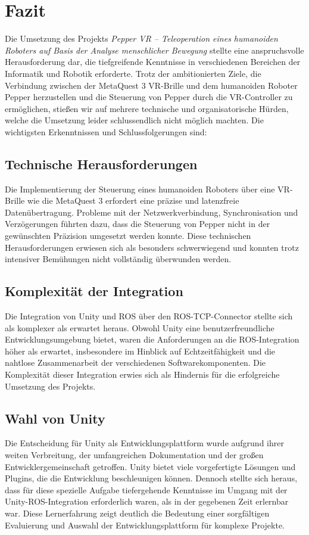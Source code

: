 \chapter{Fazit}

Die Umsetzung des Projekts \textit{Pepper VR – Teleoperation eines humanoiden Roboters auf Basis der Analyse menschlicher Bewegung} stellte eine anspruchsvolle Herausforderung dar, die tiefgreifende Kenntnisse in verschiedenen Bereichen der Informatik und Robotik erforderte. Trotz der ambitionierten Ziele, die Verbindung zwischen der MetaQuest 3 VR-Brille und dem humanoiden Roboter Pepper herzustellen und die Steuerung von Pepper durch die VR-Controller zu ermöglichen, stießen wir auf mehrere technische und organisatorische Hürden, welche die Umsetzung leider schlussendlich nicht möglich machten.
\newline
Die wichtigsten Erkenntnissen und Schlussfolgerungen sind:

\section{Technische Herausforderungen}
Die Implementierung der Steuerung eines humanoiden Roboters über eine VR-Brille wie die MetaQuest 3 erfordert eine präzise und latenzfreie Datenübertragung. Probleme mit der Netzwerkverbindung, Synchronisation und Verzögerungen führten dazu, dass die Steuerung von Pepper nicht in der gewünschten Präzision umgesetzt werden konnte. Diese technischen Herausforderungen erwiesen sich als besonders schwerwiegend und konnten trotz intensiver Bemühungen nicht vollständig überwunden werden.

\section{Komplexität der Integration}
Die Integration von Unity und ROS über den ROS-TCP-Connector stellte sich als komplexer als erwartet heraus. Obwohl Unity eine benutzerfreundliche Entwicklungsumgebung bietet, waren die Anforderungen an die ROS-Integration höher als erwartet, insbesondere im Hinblick auf Echtzeitfähigkeit und die nahtlose Zusammenarbeit der verschiedenen Softwarekomponenten. Die Komplexität dieser Integration erwies sich als Hindernis für die erfolgreiche Umsetzung des Projekts.

\section{Wahl von Unity}
Die Entscheidung für Unity als Entwicklungsplattform wurde aufgrund ihrer weiten Verbreitung, der umfangreichen Dokumentation und der großen Entwicklergemeinschaft getroffen. Unity bietet viele vorgefertigte Lösungen und Plugins, die die Entwicklung beschleunigen können. Dennoch stellte sich heraus, dass für diese spezielle Aufgabe tiefergehende Kenntnisse im Umgang mit der Unity-ROS-Integration erforderlich waren, als in der gegebenen Zeit erlernbar war. Diese Lernerfahrung zeigt deutlich die Bedeutung einer sorgfältigen Evaluierung und Auswahl der Entwicklungsplattform für komplexe Projekte.

